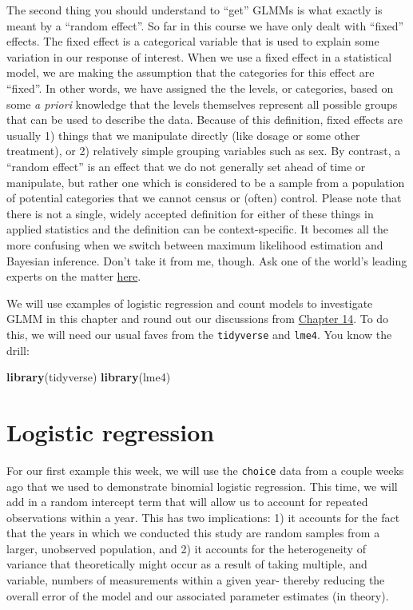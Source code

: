 \documentclass[
]{book}
\newenvironment{Shaded}{\begin{snugshade}}{\end{snugshade}}
\newcommand{\KeywordTok}[1]{\textcolor[rgb]{0.13,0.29,0.53}{\textbf{#1}}}
\newcommand{\NormalTok}[1]{#1}
\begin{document}
The second thing you should understand to ``get'' GLMMs is what exactly is meant by a ``random effect''. So far in this course we have only dealt with ``fixed'' effects. The fixed effect is a categorical variable that is used to explain some variation in our response of interest. When we use a fixed effect in a statistical model, we are making the assumption that the categories for this effect are ``fixed''. In other words, we have assigned the the levels, or categories, based on some \emph{a priori} knowledge that the levels themselves represent all possible groups that can be used to describe the data. Because of this definition, fixed effects are usually 1) things that we manipulate directly (like dosage or some other treatment), or 2) relatively simple grouping variables such as sex. By contrast, a ``random effect'' is an effect that we do not generally set ahead of time or manipulate, but rather one which is considered to be a sample from a population of potential categories that we cannot census or (often) control. Please note that there is not a single, widely accepted definition for either of these things in applied statistics and the definition can be context-specific. It becomes all the more confusing when we switch between maximum likelihood estimation and Bayesian inference. Don't take it from me, though. Ask one of the world's leading experts on the matter \href{http://andrewgelman.com/2005/01/25/why_i_dont_use/}{here}.

We will use examples of logistic regression and count models to investigate GLMM in this chapter and round out our discussions from \protect\hyperlink{Chapter14}{Chapter 14}. To do this, we will need our usual faves from the \texttt{tidyverse} and \texttt{lme4}. You know the drill:

\begin{Shaded}
\begin{Highlighting}[]
\KeywordTok{library}\NormalTok{(tidyverse)}
\KeywordTok{library}\NormalTok{(lme4)}
\end{Highlighting}
\end{Shaded}

\hypertarget{glmm-logistic}{%
\section{Logistic regression}\label{glmm-logistic}}

For our first example this week, we will use the \texttt{choice} data from a couple weeks ago that we used to demonstrate binomial logistic regression. This time, we will add in a random intercept term that will allow us to account for repeated observations within a year. This has two implications: 1) it accounts for the fact that the years in which we conducted this study are random samples from a larger, unobserved population, and 2) it accounts for the heterogeneity of variance that theoretically might occur as a result of taking multiple, and variable, numbers of measurements within a given year- thereby reducing the overall error of the model and our associated parameter estimates (in theory).
\end{document}
